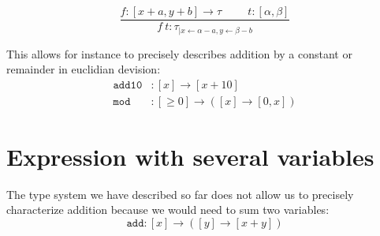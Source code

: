 \documentclass{article}
\newcommand{\substitution}[2]{\ensuremath{#1_{|#2}}}
\begin{document}
\[ \frac{f : [x+a,y+b] \rightarrow \tau \hspace{1cm} t : [\alpha,\beta]}{ f~t : \substitution{\tau}{x\leftarrow \alpha-a, y\leftarrow \beta-b}} 
\]
 

This allows for instance to precisely describes addition by a constant or remainder in euclidian devision:
\begin{align*}
\texttt{add10} & : [x] \rightarrow [x+10] \\
\texttt{mod} & : [\ge 0] \rightarrow ( [x] \rightarrow [0,x] )
\end{align*}

\section{Expression with several variables}
The type system we have described so far does not allow us to precisely characterize addition because we would need to sum two variables:
\[\texttt{add} : [x] \rightarrow ( [y] \rightarrow [x+y]) \]
\end{document}
